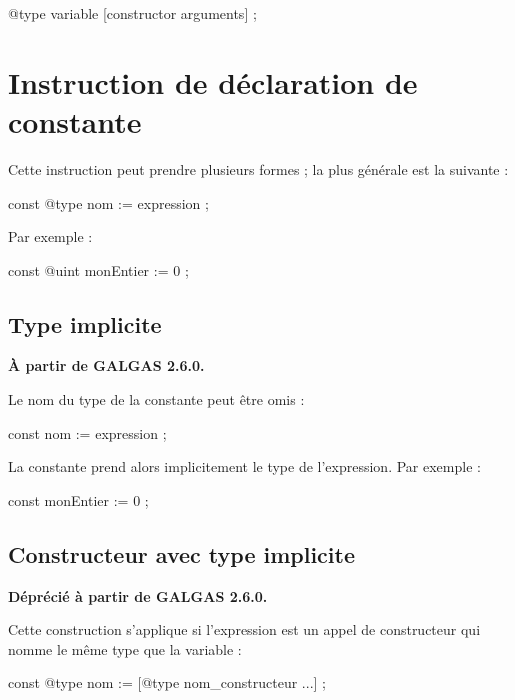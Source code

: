 {
\begin{galgascode}
@type variable [constructor arguments] ;
\end{galgascode}
}


\section{Instruction de déclaration de constante}

Cette instruction peut prendre plusieurs formes ; la plus générale est la suivante :
\begin{galgascode}
const @type nom := expression ;
\end{galgascode}

Par exemple :
\begin{galgascode}
const @uint monEntier := 0 ;
\end{galgascode}

\subsection{Type implicite}

\textbf{À partir de GALGAS 2.6.0.}


Le nom du type de la constante peut être omis :
\begin{galgascode}
const nom := expression ;
\end{galgascode}

La constante prend alors implicitement le type de l'expression. Par exemple :
\begin{galgascode}
const monEntier := 0 ;
\end{galgascode}



\subsection{Constructeur avec type implicite}

\textbf{Déprécié à partir de GALGAS 2.6.0.}

Cette construction s'applique si l'expression est un appel de constructeur qui nomme le même type que la variable :
\begin{galgascode}
const @type nom := [@type nom_constructeur ...] ;
\end{galgascode}

